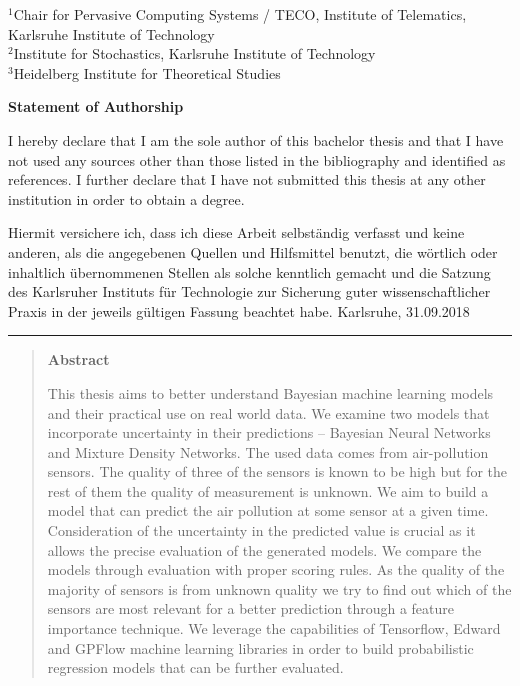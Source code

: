 \documentclass[12pt,a4paper,twoside]{scrartcl}
\numberwithin{equation}{section}
\begin{document}
\begin{titlepage}
\begin{center}
    \vspace*{10mm}


    \(^1\)Chair for Pervasive Computing Systems / TECO, Institute of Telematics, Karlsruhe Institute of Technology\\
    \(^2\)Institute for Stochastics, Karlsruhe Institute of Technology\\
    \(^3\)Heidelberg Institute for Theoretical Studies

    
  \end{center}

\end{titlepage}



\centerline{\bf Statement of Authorship}
\vfill

I hereby declare that I am the sole author of this bachelor thesis and that I have not used any sources other than those listed in the bibliography and identified as references. I further declare that I have not submitted this thesis at any other institution in order to obtain a degree.

\vfill
\noindent

\vfill
Hiermit versichere ich, dass ich diese Arbeit selbständig verfasst und keine anderen, als die angegebenen Quellen und Hilfsmittel benutzt, die wörtlich oder inhaltlich übernommenen Stellen als solche kenntlich gemacht und die Satzung des Karlsruher Instituts für Technologie zur Sicherung guter wissenschaftlicher Praxis in der jeweils gültigen Fassung beachtet habe.
\vfill
\noindent
Karlsruhe, 31.09.2018
\hrule


\vspace*{5cm}

\clearpage


\vspace*{0pt}\vfill


\begin{abstract}
  \centerline{\bf Abstract}
  This thesis aims to better understand Bayesian machine learning models and their practical use on real world data. We examine two models that incorporate uncertainty in their predictions -- Bayesian Neural Networks and Mixture Density Networks. The used data comes from air-pollution sensors. The quality of three of the sensors is known to be high but for the rest of them the quality of measurement is unknown. We aim to build a model that can predict the air pollution at some sensor at a given time. Consideration of the uncertainty in the predicted value is crucial as it allows the precise evaluation of the generated models. We compare the models through evaluation with proper scoring rules. As the quality of the majority of sensors is from unknown quality we try to find out which of the sensors are most relevant for a better prediction through a feature importance technique. We leverage the capabilities of Tensorflow, Edward and GPFlow machine learning libraries in order to build probabilistic regression models that can be further evaluated.
\end{abstract}
\end{document}
